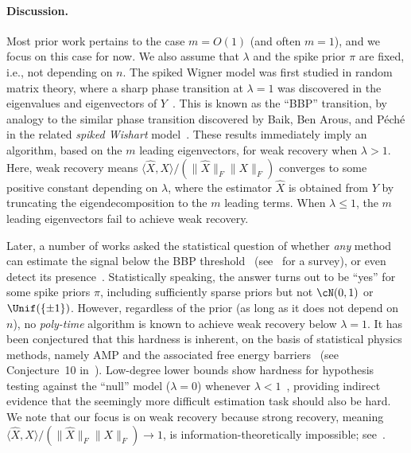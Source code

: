\documentclass[11pt]{article}
\begin{document}
\paragraph{Discussion.}

Most prior work pertains to the case $m=O(1)$ (and often $m=1$), and we focus on this case for now. We also assume that $\lambda$ and the spike prior $\pi$ are fixed, i.e., not depending on $n$. The spiked Wigner model was first studied in random matrix theory, where a sharp phase transition at $\lambda=1$ was discovered in the eigenvalues and eigenvectors of $Y$~\cite{peche,FP-wigner,maida,CDF-wigner,BN-eigenvec}. This is known as the ``BBP'' transition, by analogy to the similar phase transition discovered by Baik, Ben Arous, and P{\'e}ch{\'e} in the related \emph{spiked Wishart} model~\cite{BBP}. These results immediately imply an algorithm, based on the $m$ leading eigenvectors, for weak recovery when $\lambda > 1$. Here, weak recovery means $\langle \hat{X},X \rangle/(\|\hat{X}\|_F \|X\|_F)$ converges to some positive constant depending on $\lambda$, where the estimator $\hat{X}$ is obtained from $Y$ by truncating the eigendecomposition to the $m$ leading terms. When $\lambda \le 1$, the $m$ leading eigenvectors fail to achieve weak recovery.

Later, a number of works asked the statistical question of whether \emph{any} method can estimate the signal below the BBP threshold~\cite{FR-amp,MMSE,proof-replica,LM-wigner,short-replica} (see~\cite{miolane-survey} for a survey), or even detect its presence~\cite{MRZ,BMVVX,opt-subopt,fund-limits-wigner}. Statistically speaking, the answer turns out to be ``yes'' for some spike priors $\pi$, including sufficiently sparse priors but not $\cN(0,1)$ or $\Unif(\{\pm 1\})$. However, regardless of the prior (as long as it does not depend on $n$), no \emph{poly-time} algorithm is known to achieve weak recovery below $\lambda = 1$. It has been conjectured that this hardness is inherent, on the basis of statistical physics methods, namely AMP and the associated free energy barriers~\cite{MMSE} (see Conjecture~10 in~\cite{LM-wigner}). Low-degree lower bounds show hardness for hypothesis testing against the ``null'' model ($\lambda = 0$) whenever $\lambda < 1$~\cite{ld-notes,spectral-planting}, providing indirect evidence that the seemingly more difficult estimation task should also be hard. We note that our focus is on weak recovery because strong recovery, meaning $\langle \hat{X},X \rangle/(\|\hat{X}\|_F \|X\|_F) \to 1$, is information-theoretically impossible; see~\cite{LM-wigner,pbm24}.
\end{document}
